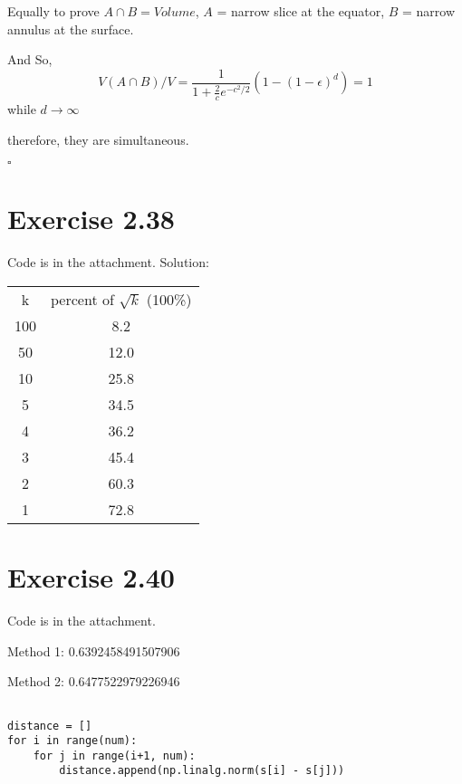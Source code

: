 \documentclass[paper=a4, fontsize=11pt]{scrartcl} %
\numberwithin{equation}{section} %
\numberwithin{figure}{section} %
\numberwithin{table}{section} %
\begin{document}
Equally to prove $A \cap B = Volume$, $A$ = narrow slice at the equator, $B$ = narrow annulus at the surface.

And So, 
$$ V(A \cap B) / V = \frac{1}{1 + \frac{2}{c}e^{-c^2/2}}(1 - (1-\epsilon)^d) = 1 $$
while $d \rightarrow \infty$

therefore, they are simultaneous. 
\begin{flushright} \item{$\square$} \end{flushright}

\section*{Exercise 2.38}

Code is in the attachment.
\newline
Solution:

\begin{tabular}{cc}

k & percent of $\sqrt{k}$ (100\%) \\
100 & 8.2 \\
50 & 12.0 \\
10 & 25.8 \\ 
5 & 34.5 \\
4 & 36.2 \\
3 & 45.4 \\
2 & 60.3 \\
1 & 72.8 \\

\end{tabular}

\section*{Exercise 2.40}

Code is in the attachment.

\begin{description}
    \item Method 1: 0.6392458491507906
    \item Method 2: 0.6477522979226946
\end{description}




\begin{lstlisting}

distance = []
for i in range(num):
    for j in range(i+1, num):
        distance.append(np.linalg.norm(s[i] - s[j]))

\end{lstlisting}
\end{document}
